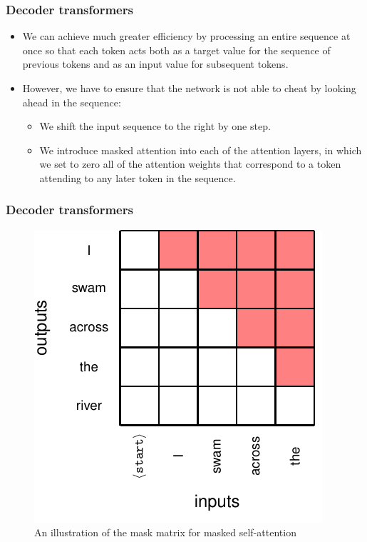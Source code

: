 \documentclass{beamer}
\begin{document}
\begin{frame}
    \frametitle{Decoder transformers}
    \begin{itemize}
        \item We can achieve much greater efficiency by processing an entire sequence at once so that each token acts both as a target value for the sequence of previous tokens and as an input value for subsequent tokens.
        \item However, we have to ensure that the network is not able to cheat by looking ahead in the sequence:
        \begin{itemize}
            \item We shift the input sequence to the right by one step.
            \item We introduce masked attention into each of the attention layers, in which we set to zero all of the attention weights that correspond to a token attending to any later token in the sequence.
        \end{itemize}
    \end{itemize}
\end{frame}

\begin{frame}
    \frametitle{Decoder transformers}
    \begin{figure}
        \caption{An illustration of the mask matrix for masked self-attention}
        \includegraphics[height=0.7\textheight]{Figure_16.pdf}
    \end{figure}
\end{frame}
\end{document}
